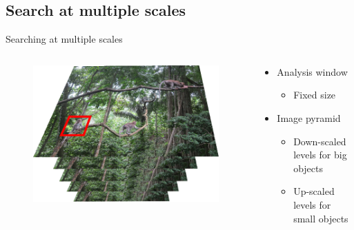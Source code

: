 \documentclass{beamer}[10pt, usepdftitle=false, handout]
\begin{document}
	 \subsection{Search at multiple scales}
    \begin{frame}

	Searching at multiple scales
	\vspace*{1.0em}	
	
\begin{columns}
\begin{column}{0.5\textwidth}
	\begin{figure}
		\includegraphics[scale=0.3]{monkey-4.png} 
	\end{figure}	 
\end{column}
\begin{column}{0.5\textwidth}  %
    \begin{center}
	\begin{itemize}
	\item{Analysis window 
		\begin{itemize}
			\item{Fixed size}
		\end{itemize}			
	}
	\item{Image pyramid
		\begin{itemize}
		\item{Down-scaled levels for big objects}
		\item{Up-scaled levels for small objects}
		\end{itemize}			
	}
	\end{itemize}	     
     
     \end{center}
	\end{column}
	\end{columns}	
				
    \end{frame}
	
\end{document}
